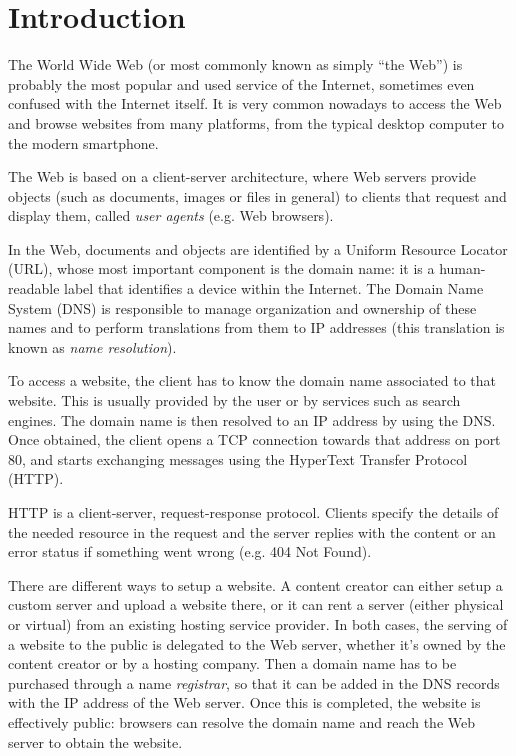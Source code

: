 \documentclass[mscthesis]{usiinfthesis}
\begin{document}
\tableofcontents

\mainmatter

\chapter{Introduction}\label{ch:intro}

The World Wide Web (or most commonly known as simply ``the Web'') is probably the most popular and used service of the Internet, sometimes even confused with the Internet itself. It is very common nowadays to access the Web and browse websites from many platforms, from the typical desktop computer to the modern smartphone.

The Web is based on a client-server architecture, where Web servers provide objects (such as documents, images or files in general) to clients that request and display them, called \textit{user agents} (e.g. Web browsers).

In the Web, documents and objects are identified by a Uniform Resource Locator (URL), whose most important component is the domain name: it is a human-readable label that identifies a device within the Internet. The Domain Name System (DNS) is responsible to manage organization and ownership of these names and to perform translations from them to IP addresses (this translation is known as \emph{name resolution}).

To access a website, the client has to know the domain name associated to that website. This is usually provided by the user or by services such as search engines. The domain name is then resolved to an IP address by using the DNS. Once obtained, the client opens a TCP connection towards that address on port 80, and starts exchanging messages using the HyperText Transfer Protocol (HTTP).

HTTP is a client-server, request-response protocol. Clients specify the details of the needed resource in the request and the server replies with the content or an error status if something went wrong (e.g. 404 Not Found).

There are different ways to setup a website. A content creator can either setup a custom server and upload a website there, or it can rent a server (either physical or virtual) from an existing hosting service provider. In both cases, the serving of a website to the public is delegated to the Web server, whether it's owned by the content creator or by a hosting company. Then a domain name has to be purchased through a name \emph{registrar}, so that it can be added in the DNS records with the IP address of the Web server. Once this is completed, the website is effectively public: browsers can resolve the domain name and reach the Web server to obtain the website.
\end{document}
